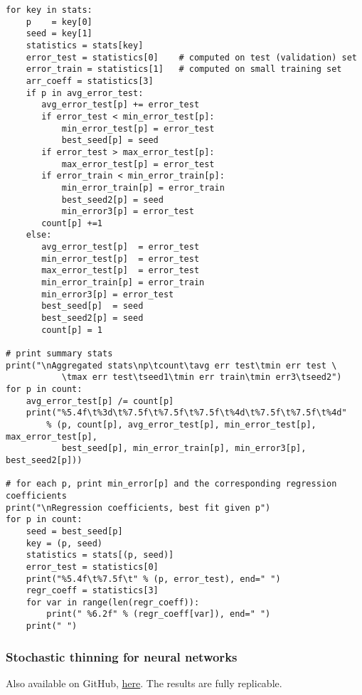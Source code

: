 \documentclass[oneside,10pt]{book}
\begin{document}
\begin{lstlisting}
for key in stats:
    p    = key[0]
    seed = key[1]
    statistics = stats[key]
    error_test = statistics[0]    # computed on test (validation) set
    error_train = statistics[1]   # computed on small training set
    arr_coeff = statistics[3]
    if p in avg_error_test:
       avg_error_test[p] += error_test
       if error_test < min_error_test[p]:
           min_error_test[p] = error_test
           best_seed[p] = seed
       if error_test > max_error_test[p]:
           max_error_test[p] = error_test
       if error_train < min_error_train[p]:
           min_error_train[p] = error_train
           best_seed2[p] = seed
           min_error3[p] = error_test
       count[p] +=1
    else:
       avg_error_test[p]  = error_test
       min_error_test[p]  = error_test
       max_error_test[p]  = error_test
       min_error_train[p] = error_train
       min_error3[p] = error_test
       best_seed[p]  = seed
       best_seed2[p] = seed
       count[p] = 1

# print summary stats
print("\nAggregated stats\np\tcount\tavg err test\tmin err test \
           \tmax err test\tseed1\tmin err train\tmin err3\tseed2")
for p in count:
    avg_error_test[p] /= count[p]
    print("%5.4f\t%3d\t%7.5f\t%7.5f\t%7.5f\t%4d\t%7.5f\t%7.5f\t%4d"
        % (p, count[p], avg_error_test[p], min_error_test[p], max_error_test[p], 
           best_seed[p], min_error_train[p], min_error3[p], best_seed2[p]))

# for each p, print min_error[p] and the corresponding regression coefficients 
print("\nRegression coefficients, best fit given p")
for p in count: 
    seed = best_seed[p]
    key = (p, seed)
    statistics = stats[(p, seed)]
    error_test = statistics[0] 
    print("%5.4f\t%7.5f\t" % (p, error_test), end=" ")
    regr_coeff = statistics[3]   
    for var in range(len(regr_coeff)):
        print(" %6.2f" % (regr_coeff[var]), end=" ")
    print(" ")
\end{lstlisting}

\subsubsection{Stochastic thinning for neural networks}\label{crottalbourrique}

Also available on GitHub, \href{https://github.com/VincentGranville/Statistical-Optimization/blob/main/thinned_neuralNets.py}{here}. 
The results are fully replicable.\vspace{1ex}
\end{document}
